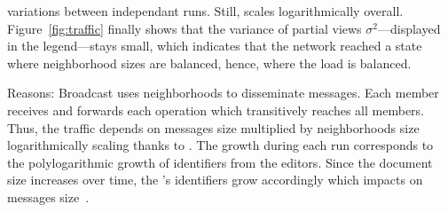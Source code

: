\begin{asparadesc}
  variations between independant runs. Still, \SPRAY scales
  logarithmically overall. Figure~\ref{fig:traffic} finally shows that
  the variance of partial views $\sigma^2$---displayed in the
  legend---stays small, which indicates that the network reached a
  state where neighborhood sizes are balanced, hence, where the load is
  balanced.
\item [Reasons:] Broadcast uses neighborhoods to disseminate messages. Each
  member receives and forwards each operation which transitively reaches all
  members. Thus, the traffic depends on messages size multiplied by
  neighborhoods size logarithmically scaling thanks to \SPRAY. The growth during
  each run corresponds to the polylogarithmic growth of identifiers from the
  editors. Since the document size increases over time, the \LSEQ's identifiers
  grow accordingly which impacts on messages size~\cite{nedelec2013lseq}.
\end{asparadesc}


